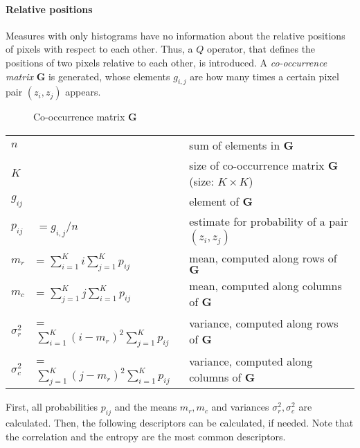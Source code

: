 \paragraph{Relative positions} Measures with only histograms have no information about the relative positions of pixels with respect to each other.
Thus, a $Q$ operator, that defines the positions of two pixels relative to each other, is introduced. 
A \emph{co-occurrence matrix} $\mathbf{G}$ is generated, whose elements $g_{i,j}$ are how many times a certain pixel pair $(z_i,z_j)$ appears. \\

\begin{figure}[h]
	\centering
	
	\caption{Co-occurrence matrix $\mathbf{G}$}
\end{figure}

\begin{table}[h]
	\begin{tabular}{lll}
		$n$	& & sum of elements in $\mathbf{G}$ \\
		$K$ & & size of co-occurrence matrix $\mathbf{G}$ (size: $K \times K$) \\
		$g_{ij}$ & & element of $\mathbf{G}$ \\
		$p_{ij}$ & $= g_{i,j} / n$ & estimate for probability of a pair $(z_i,z_j)$ \\
		$m_r$ &= $\sum\limits_{i=1}^{K} i \sum\limits_{j=1}^{K} p_{ij}$ & mean, computed along rows of $\mathbf{G}$ \\
		$m_c$ &= $\sum\limits_{j=1}^{K} j \sum\limits_{i=1}^{K} p_{ij}$ & mean, computed along columns of $\mathbf{G}$ \\
		$\sigma_r^2$ &= $\sum\limits_{i=1}^{K} (i-m_r)^2 \sum\limits_{j=1}^{K} p_{ij}$ & variance, computed along rows of $\mathbf{G}$ \\
		$\sigma_c^2$ &= $\sum\limits_{j=1}^{K} (j-m_r)^2 \sum\limits_{i=1}^{K} p_{ij}$ & variance, computed along columns of $\mathbf{G}$ \\
	\end{tabular}
\end{table}

First, all probabilities $p_{ij}$ and the means $m_r, m_c$ and variances $\sigma_r^2,\sigma_c^2$ are calculated. 
Then, the following descriptors can be calculated, if needed. Note that the correlation and the entropy are the most common descriptors.

